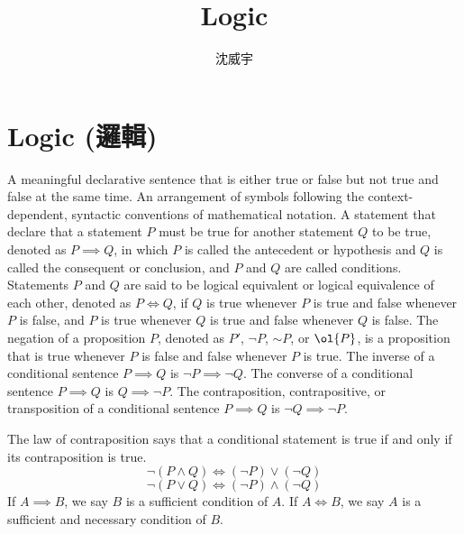 \documentclass[a4paper,12pt]{article}
\begin{document}
\title{Logic}
\author{沈威宇}
\date{\temtoday}
\titletocdoc
\section{Logic (邏輯)}
A meaningful declarative sentence that is either true or false but not true and false at the same time.
An arrangement of symbols following the context-dependent, syntactic conventions of mathematical notation.
A statement that declare that a statement $P$ must be true for another statement $Q$ to be true, denoted as $P\implies Q$, in which $P$ is called the antecedent or hypothesis and $Q$ is called the consequent or conclusion, and $P$ and $Q$ are called conditions.
Statements $P$ and $Q$ are said to be logical equivalent or logical equivalence of each other, denoted as $P\iff Q$, if $Q$ is true whenever $P$ is true and false whenever $P$ is false, and $P$ is true whenever $Q$ is true and false whenever $Q$ is false.
The negation of a proposition $P$, denoted as $P'$, $\neg P$, $\mathord{\sim}P$, or $\ol{P}$, is a proposition that is true whenever $P$ is false and false whenever $P$ is true.
The inverse of a conditional sentence $P \implies Q$ is $\neg P \implies \neg Q$.
The converse of a conditional sentence $P \implies Q$ is $Q \implies \neg P$.
The contraposition, contrapositive, or transposition of a conditional sentence $P \implies Q$ is $\neg Q \implies \neg P$.

The law of contraposition says that a conditional statement is true if and only if its contraposition is true.
\[\neg (P\land Q)\iff (\neg P)\lor (\neg Q)\]
\[\neg (P\lor Q)\iff (\neg P)\land (\neg Q)\]
If \( A \implies B \), we say $B$ is a sufficient condition of $A$.
If \( A \iff B \), we say $A$ is a sufficient and necessary condition of $B$.
\end{document}
